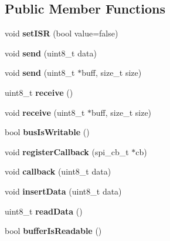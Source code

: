 \subsection*{Public Member Functions}
\begin{DoxyCompactItemize}
\item 
\mbox{\label{classSlaveSPI_a1a89540f74f13d1189540158df8cdcc0}} 
void {\bfseries set\+I\+SR} (bool value=false)
\item 
\mbox{\label{classSlaveSPI_a285c49176f81546e1d50858a9fb4b679}} 
void {\bfseries send} (uint8\+\_\+t data)
\item 
\mbox{\label{classSlaveSPI_a20e086294af941e947ad28bc2632b0e5}} 
void {\bfseries send} (uint8\+\_\+t $\ast$buff, size\+\_\+t size)
\item 
\mbox{\label{classSlaveSPI_a10b62b984e18c7488f3a441bf81726a4}} 
uint8\+\_\+t {\bfseries receive} ()
\item 
\mbox{\label{classSlaveSPI_a47a1a8f35c4386d72e29b6850c6b9519}} 
void {\bfseries receive} (uint8\+\_\+t $\ast$buff, size\+\_\+t size)
\item 
\mbox{\label{classSlaveSPI_a4e488538a3ba502d7e81a0380e012986}} 
bool {\bfseries bus\+Is\+Writable} ()
\item 
\mbox{\label{classSlaveSPI_a6dc365f65961de53d09d3ed8243a48c8}} 
void {\bfseries register\+Callback} (spi\+\_\+cb\+\_\+t $\ast$cb)
\item 
\mbox{\label{classSlaveSPI_afd171add4870a19ec6eb9fa63c479de3}} 
void {\bfseries callback} (uint8\+\_\+t data)
\item 
\mbox{\label{classSlaveSPI_a8f0330b4050492a51e2d359a980734d0}} 
void {\bfseries insert\+Data} (uint8\+\_\+t data)
\item 
\mbox{\label{classSlaveSPI_aa89118ab2eda4f4e31617b3590568706}} 
uint8\+\_\+t {\bfseries read\+Data} ()
\item 
\mbox{\label{classSlaveSPI_a29b4bec6bb4e7aa3082aeeec5d37ea4f}} 
bool {\bfseries buffer\+Is\+Readable} ()
\end{DoxyCompactItemize}
